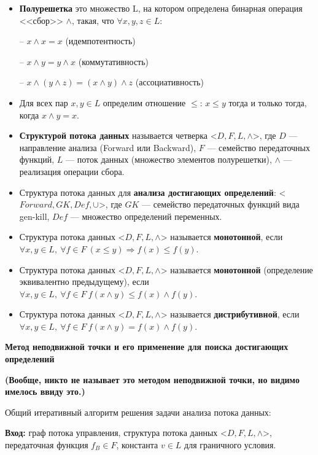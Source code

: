 \begin{itemize}
    \item \textbf{Полурешетка} это множество L, на котором определена бинарная операция <<сбор>> $\land$, такая, что $\forall x, y, z \in L$:
    \item[--] $x \land x = x$ (идемпотентность)
    \item[--] $x \land y = y \land x$ (коммутативность)
    \item[--] $x \land (y \land z) = (x \land y) \land z$ (ассоциативность)

    \item Для всех пар $x, y \in L$ определим отношение $\leqslant$: $x \leqslant y$ тогда и только тогда, когда $x \land y = x$.

    \item \textbf{Структурой потока данных} называется четверка <$D, F, L, \land$>, где $D$ --- направление анализа (Forward или Backward), $F$ --- семейство передаточных функций, $L$ --- поток данных (множество элементов полурешетки), $\land$ --- реализация операции сбора.
    \item Структура потока данных для \textbf{анализа достигающих определений}: <$Forward, GK, Def, \cup $>, где $GK$ --- семейство передаточных функций вида gen-kill, $Def$ --- множество определений переменных.
    \item Структура потока данных <$D, F, L, \land$> называется \textbf{монотонной}, если $\forall x, y \in L,~\forall f \in F ~ (x \leqslant y) \Rightarrow f(x) \leqslant f(y)$.
    \item Структура потока данных <$D, F, L, \land$> называется \textbf{монотонной} (определение эквивалентно предыдущему), если $\forall x, y \in L,~\forall f \in F ~ f (x \land y) \leqslant f(x) \land f(y)$.
    \item Структура потока данных <$D, F, L, \land$> называется \textbf{дистрибутивной}, если $\forall x,y \in L,~\forall f \in F ~ f (x \land y) = f (x) \land f (y)$.
\end{itemize}

\textbf{Метод неподвижной точки и его применение для поиска достигающих определений}

\textbf{\textbf{(Вообще, никто не называет это методом неподвижной точки, но видимо имелось ввиду это.)}}

Общий итеративный алгоритм решения задачи анализа потока данных:

\textbf{Вход:} граф потока управления, структура потока данных <$D, F, L, \land$>, передаточная функция $f_B \in F$, константа $v \in L$ для граничного условия.


